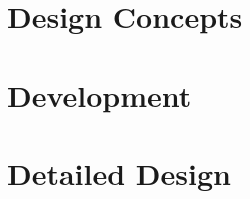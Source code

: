 \documentclass{article}
\begin{document}
    
\section{Design Concepts}

\section{Development}
    
\section{Detailed Design}
    
\end{document}
